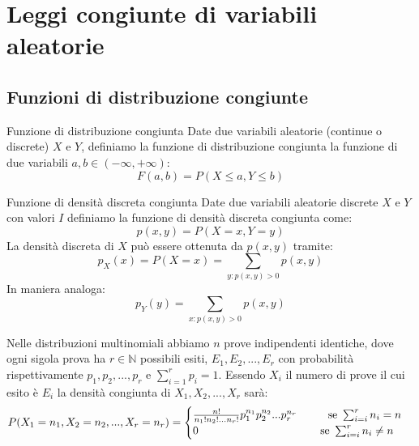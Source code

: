 \chapter{Leggi congiunte di variabili aleatorie}
\section{Funzioni di distribuzione congiunte}

\begin{Definition}{Funzione di distribuzione congiunta}{}
    Date due variabili aleatorie (continue o discrete) $X$ e $Y$, definiamo la funzione di distribuzione congiunta la funzione di due variabili $a,b\in(-\infty,+\infty)$:
    \begin{equation*}
        F(a,b)=P(X\leq a, Y\leq b)
    \end{equation*}
\end{Definition}

\begin{Definition}{Funzione di densità discreta congiunta}{}
    Date due variabili aleatorie discrete $X$ e $Y$ con valori $I$ definiamo la funzione di densità discreta congiunta come:
    \begin{equation*}
        p(x,y)=P(X=x,Y=y) 
    \end{equation*}
    La densità discreta di $X$ può essere ottenuta da $p(x, y)$ tramite:
    \begin{equation*}
        p_X(x)=P(X=x)=\sum_{y:p(x,y)>0}p(x,y)
    \end{equation*}
    In maniera analoga:
    \begin{equation*}
        p_Y(y)=\sum_{x:p(x,y)>0}p(x,y)
    \end{equation*}
\end{Definition}

Nelle distribuzioni multinomiali abbiamo $n$ prove indipendenti identiche, dove ogni sigola prova ha $r\in\mathbb{N}$ possibili esiti, $E_1, E_2, ..., E_r$ con probabilità rispettivamente $p_1, p_2, ..., p_r$ e $\sum^r_{i=1}p_i=1$. Essendo $X_i$ il numero di prove il cui esito è $E_i$ la densità congiunta di $X_1, X_2, ..., X_r$ sarà:
\begin{equation*}
    P(X_1=n_1, X_2=n_2, ..., X_r=n_r)=\begin{cases}
        \frac{n!}{n_1!n_2!...n_r!}p_1^{n_1}p_2^{n_2}...p_r^{n_r}\hspace{1cm
        }\mbox{se }\sum^r_{i=i}n_i=n\\0\hspace{3.9cm}\mbox{se }\sum^r_{i=i}n_i\neq n
    \end{cases}
\end{equation*}

